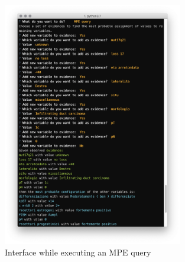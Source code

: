 \begin{figure}[htbp]
\centerline{\includegraphics[width=0.7\textwidth]{methodology/images/nl-mpe-query}}
\caption{Interface while executing an MPE query}
\label{fig:nl-mpe}
\end{figure}




